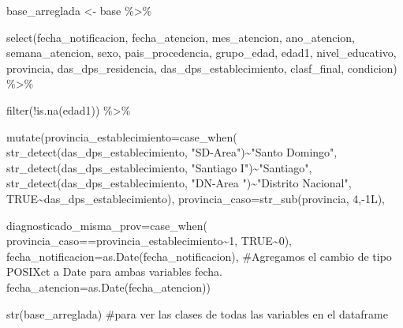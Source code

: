 \documentclass[
  letterpaper,
  DIV=11,
  numbers=noendperiod]{scrreprt}
\newenvironment{Shaded}{\begin{snugshade}}{\end{snugshade}}
\newcommand{\AttributeTok}[1]{\textcolor[rgb]{0.40,0.45,0.13}{#1}}
\newcommand{\CommentTok}[1]{\textcolor[rgb]{0.37,0.37,0.37}{#1}}
\newcommand{\ConstantTok}[1]{\textcolor[rgb]{0.56,0.35,0.01}{#1}}
\newcommand{\DecValTok}[1]{\textcolor[rgb]{0.68,0.00,0.00}{#1}}
\newcommand{\FunctionTok}[1]{\textcolor[rgb]{0.28,0.35,0.67}{#1}}
\newcommand{\NormalTok}[1]{\textcolor[rgb]{0.00,0.23,0.31}{#1}}
\newcommand{\OtherTok}[1]{\textcolor[rgb]{0.00,0.23,0.31}{#1}}
\newcommand{\SpecialCharTok}[1]{\textcolor[rgb]{0.37,0.37,0.37}{#1}}
\newcommand{\StringTok}[1]{\textcolor[rgb]{0.13,0.47,0.30}{#1}}
\begin{document}
\begin{Shaded}
\begin{Highlighting}[]
\NormalTok{base\_arreglada }\OtherTok{\textless{}{-}}\NormalTok{ base }\SpecialCharTok{\%\textgreater{}\%}

  \FunctionTok{select}\NormalTok{(fecha\_notificacion,}
\NormalTok{         fecha\_atencion,}
\NormalTok{         mes\_atencion,}
\NormalTok{         ano\_atencion,}
\NormalTok{         semana\_atencion,}
\NormalTok{         sexo,}
\NormalTok{         pais\_procedencia,}
\NormalTok{         grupo\_edad,}
\NormalTok{         edad1,}
\NormalTok{         nivel\_educativo,}
\NormalTok{         provincia,}
\NormalTok{         das\_dps\_residencia,}
\NormalTok{         das\_dps\_establecimiento,}
\NormalTok{         clasf\_final,}
\NormalTok{         condicion) }\SpecialCharTok{\%\textgreater{}\%} 
  
  \FunctionTok{filter}\NormalTok{(}\SpecialCharTok{!}\FunctionTok{is.na}\NormalTok{(edad1)) }\SpecialCharTok{\%\textgreater{}\%}  
  
  \FunctionTok{mutate}\NormalTok{(}\AttributeTok{provincia\_establecimiento=}\FunctionTok{case\_when}\NormalTok{(}
             \FunctionTok{str\_detect}\NormalTok{(das\_dps\_establecimiento, }\StringTok{"SD{-}Area"}\NormalTok{)}\SpecialCharTok{\textasciitilde{}}\StringTok{"Santo Domingo"}\NormalTok{,}
             \FunctionTok{str\_detect}\NormalTok{(das\_dps\_establecimiento, }\StringTok{"Santiago I"}\NormalTok{)}\SpecialCharTok{\textasciitilde{}}\StringTok{"Santiago"}\NormalTok{,}
             \FunctionTok{str\_detect}\NormalTok{(das\_dps\_establecimiento, }\StringTok{"DN{-}Area "}\NormalTok{)}\SpecialCharTok{\textasciitilde{}}\StringTok{"Distrito Nacional"}\NormalTok{,}
             \ConstantTok{TRUE}\SpecialCharTok{\textasciitilde{}}\NormalTok{das\_dps\_establecimiento),}
         \AttributeTok{provincia\_caso=}\FunctionTok{str\_sub}\NormalTok{(provincia, }\DecValTok{4}\NormalTok{,}\SpecialCharTok{{-}}\DecValTok{1}\NormalTok{L), }
         
         \AttributeTok{diagnosticado\_misma\_prov=}\FunctionTok{case\_when}\NormalTok{(}
\NormalTok{              provincia\_caso}\SpecialCharTok{==}\NormalTok{provincia\_establecimiento}\SpecialCharTok{\textasciitilde{}}\DecValTok{1}\NormalTok{,}
                                            \ConstantTok{TRUE}\SpecialCharTok{\textasciitilde{}}\DecValTok{0}\NormalTok{),}
         \AttributeTok{fecha\_notificacion=}\FunctionTok{as.Date}\NormalTok{(fecha\_notificacion), }\CommentTok{\#Agregamos el cambio de tipo POSIXct a Date para ambas variables fecha.}
         \AttributeTok{fecha\_atencion=}\FunctionTok{as.Date}\NormalTok{(fecha\_atencion))}
  
  \FunctionTok{str}\NormalTok{(base\_arreglada) }\CommentTok{\#para ver las clases de todas las variables en el dataframe}
\end{Highlighting}
\end{Shaded}
\end{document}

